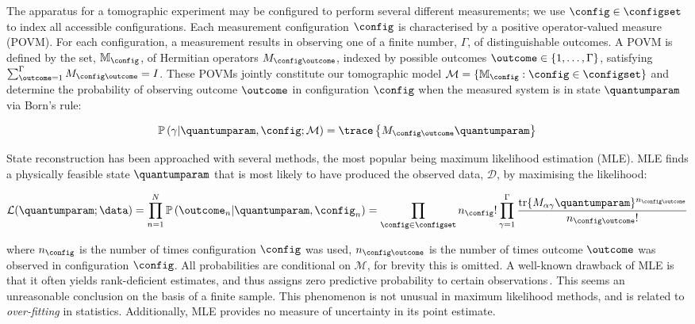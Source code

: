 The apparatus for a tomographic experiment may be configured to perform several different measurements; we use $\config\in\configset$ to index all accessible configurations. Each measurement configuration $\config$ is characterised by a positive operator-valued measure (POVM). For each configuration, a measurement results in observing one of a finite number, $\Gamma$, of distinguishable outcomes. A POVM is defined by the set, $\mathbb{M}_{\config}$, of Hermitian operators $M_{\config\outcome}$, indexed by possible outcomes $\outcome\in\{1,\ldots,\Gamma\}$, satisfying $\sum_{\outcome=1}^{\Gamma} M_{\config\outcome} = I$. These POVMs jointly constitute our tomographic model $\mathcal{M}=\{\mathbb{M}_{\config}:\config\in\configset\}$ and determine the probability of observing outcome $\outcome$ in configuration $\config$ when the measured system is in state $\quantumparam$ via Born's rule:

\begin{equation}
	\mathbb{P}\left(\gamma\vert\quantumparam,\config;\mathcal{M}\right) = \trace\left\{M_{\config\outcome}\quantumparam \right\}\label{eqn:born}\notag
\end{equation}

State reconstruction has been approached with several methods, the most popular being maximum likelihood estimation (MLE). MLE finds a physically feasible state $\quantumparam$ that is most likely to have produced the observed data, $\mathcal{D}$, by maximising the likelihood:

\begin{equation}
	\label{eqn:lik}
	\mathcal{L}(\quantumparam;\data)=\prod_{n=1}^{N} \mathbb{P}\left(\outcome_n\vert\quantumparam,\config_n\right) = \prod_{\config \in \configset}n_{\config}!\prod_{\gamma=1}^{\Gamma}\frac{\mbox{tr}\{M_{\alpha\gamma}\quantumparam\}^{n_{\config\outcome}}}{n_{\config\outcome}!}
\end{equation}

where $n_{\config}$ is the number of times configuration $\config$ was used, $n_{\config\outcome}$ is the number of times outcome $\outcome$ was observed in configuration $\config$. All probabilities are conditional on $\mathcal{M}$, for brevity this is omitted. A well-known drawback of MLE is that it often yields rank-deficient estimates, and thus assigns zero predictive probability to certain observations\,\citep{BayesianTomography}. This seems an unreasonable conclusion on the basis of a finite sample. This phenomenon is not unusual in maximum likelihood methods, and is related to \emph{over-fitting} in statistics. Additionally, MLE provides no measure of uncertainty in its point estimate.

